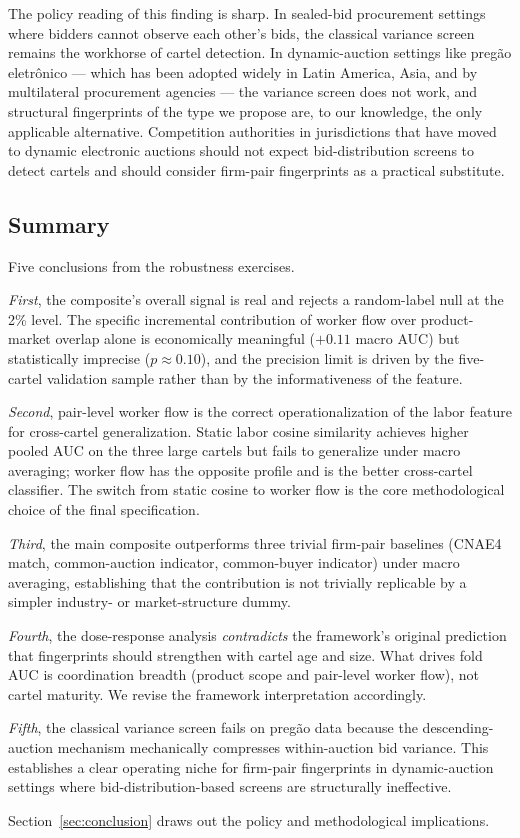 The policy reading of this finding is sharp. In sealed-bid procurement settings where bidders cannot observe each other's bids, the classical variance screen remains the workhorse of cartel detection. In dynamic-auction settings like preg\~{a}o eletr\^{o}nico --- which has been adopted widely in Latin America, Asia, and by multilateral procurement agencies --- the variance screen does not work, and structural fingerprints of the type we propose are, to our knowledge, the only applicable alternative. Competition authorities in jurisdictions that have moved to dynamic electronic auctions should not expect bid-distribution screens to detect cartels and should consider firm-pair fingerprints as a practical substitute.

\subsection{Summary}\label{sec:rob_summary}

Five conclusions from the robustness exercises.

\emph{First}, the composite's overall signal is real and rejects a random-label null at the 2\% level. The specific incremental contribution of worker flow over product-market overlap alone is economically meaningful ($+0.11$ macro AUC) but statistically imprecise ($p \approx 0.10$), and the precision limit is driven by the five-cartel validation sample rather than by the informativeness of the feature.

\emph{Second}, pair-level worker flow is the correct operationalization of the labor feature for cross-cartel generalization. Static labor cosine similarity achieves higher pooled AUC on the three large cartels but fails to generalize under macro averaging; worker flow has the opposite profile and is the better cross-cartel classifier. The switch from static cosine to worker flow is the core methodological choice of the final specification.

\emph{Third}, the main composite outperforms three trivial firm-pair baselines (CNAE4 match, common-auction indicator, common-buyer indicator) under macro averaging, establishing that the contribution is not trivially replicable by a simpler industry- or market-structure dummy.

\emph{Fourth}, the dose-response analysis \emph{contradicts} the framework's original prediction that fingerprints should strengthen with cartel age and size. What drives fold AUC is coordination breadth (product scope and pair-level worker flow), not cartel maturity. We revise the framework interpretation accordingly.

\emph{Fifth}, the classical variance screen fails on preg\~{a}o data because the descending-auction mechanism mechanically compresses within-auction bid variance. This establishes a clear operating niche for firm-pair fingerprints in dynamic-auction settings where bid-distribution-based screens are structurally ineffective.

Section~\ref{sec:conclusion} draws out the policy and methodological implications.
